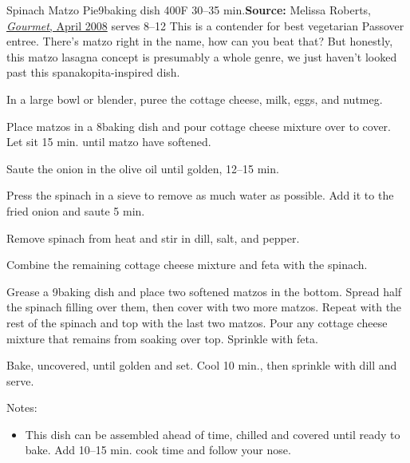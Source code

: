 \begin{recipe}[]{Spinach Matzo Pie}{9\inch{}\inch baking dish \hfill 400\0F \hfill 30--35 min.}{\textbf{Source:} Melissa Roberts, \href{https://www.epicurious.com/recipes/food/views/spinach-and-matzoh-pie-242019}{\textit{Gourmet}, April 2008} \hfill serves 8--12}
 \freeform This is a contender for best vegetarian Passover entree. There's matzo right in the name, how can you beat that? But honestly, this matzo lasagna concept is presumably a whole genre, we just haven't looked past this spanakopita-inspired dish.

 In a large bowl or blender, puree the cottage cheese, milk, eggs, and nutmeg.

 Place matzos in a 8\inch{}\inch baking dish and pour cottage cheese mixture over to cover. Let sit 15 min. until matzo have softened.

 Saute the onion in the olive oil until golden, 12--15 min.

 Press the spinach in a sieve to remove as much water as possible. Add it to the fried onion and saute 5 min.

 Remove spinach from heat and stir in dill, salt, and pepper.

 Combine the remaining cottage cheese mixture and feta with the spinach.

 Grease a 9\inch{}\inch baking dish and place two softened matzos in the bottom. Spread half the spinach filling over them, then cover with two more matzos. Repeat with the rest of the spinach and top with the last two matzos. Pour any cottage cheese mixture that remains from soaking over top. Sprinkle with feta.

 Bake, uncovered, until golden and set. Cool 10 min., then sprinkle with dill and serve.

 \freeform Notes:
 \begin{itemize}
  \item This dish can be assembled ahead of time, chilled and covered until ready to bake. Add 10--15 min. cook time and follow your nose.
 \end{itemize}
\end{recipe}
